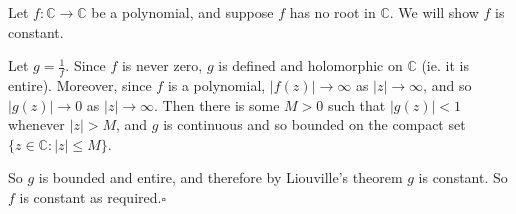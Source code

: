 \documentclass{article}
\begin{document}
Let $f \colon \mathbb{C}\rightarrow\mathbb{C}$ be a polynomial, and suppose $f$ has no root in $\mathbb{C}$.  We will show $f$ is constant.

Let $g=\frac{1}{f}$.  Since $f$ is never zero, $g$ is defined and holomorphic on $\mathbb{C}$ (ie. it is entire).  Moreover, since $f$ is a polynomial, $|f(z)|\rightarrow\infty$ as $|z|\rightarrow\infty$, and so $|g(z)|\rightarrow 0$ as $|z|\rightarrow\infty$.  Then there is some $M>0$ such that $|g(z)|<1$ whenever $|z|>M$, and $g$ is continuous and so bounded on the compact set $\{ z\in\mathbb{C}:|z|\leq M\}$.

So $g$ is bounded and entire, and therefore by Liouville's theorem $g$ is constant.  So $f$ is constant as required.$\square$
\end{document}
